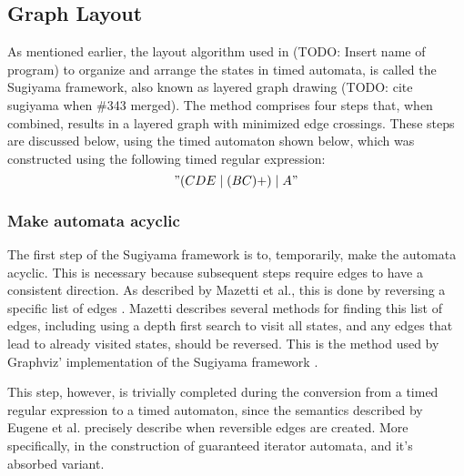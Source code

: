 \subsection{Graph Layout}





As mentioned earlier, the layout algorithm used in (TODO: Insert name of program) to organize and arrange the states in timed automata, is called the Sugiyama framework, also known as layered graph drawing (TODO: cite sugiyama when \#343 merged). The method comprises four steps that, when combined, results in a layered graph with minimized edge crossings. These steps are discussed below, using the timed automaton shown below, which was constructed using the following timed regular expression: $$"(CDE\mid(BC)+)\mid A"$$



\subsubsection{Make automata acyclic}
The first step of the Sugiyama framework is to, temporarily, make the automata acyclic. This is necessary because subsequent steps require edges to have a consistent direction. As described by Mazetti et al., this is done by reversing a specific list of edges \cite{Mazetti2012}.
Mazetti describes several methods for finding this list of edges, including using a depth first search to visit all states, and any edges that lead to already visited states, should be reversed.
This is the method used by Graphviz' implementation of the Sugiyama framework \cite{Graphviz}. %

This step, however, is trivially completed during the conversion from a timed regular expression to a timed automaton, since the semantics described by Eugene et al. precisely describe when reversible edges are created.
More specifically, in the construction of guaranteed iterator automata, and it's absorbed variant\cite{Eugene2001}.


